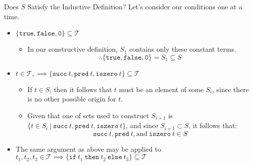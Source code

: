 \documentclass[11pt]{beamer}
\begin{document}
\begin{frame}[fragile=singleslide]{Does $S$ Satisfy the Inductive Definition?}
Let's consider our conditions one at a time.
\begin{itemize}
\item $\{\texttt{true}, \texttt{false}, \texttt{0}\} \subseteq \mathcal{T}$
\begin{itemize}
\item In our constructive definition, $S_1$ contains only these constant terms.  
\begin{equation}
\therefore \{\texttt{true}, \texttt{false}, \texttt{0}\} = S_1 \subseteq S
\end{equation}
\end{itemize}
\item $t \in \mathcal{T}, \implies \{\texttt{succ}\: t, \texttt{pred}\: t, \texttt{iszero}\: t\} \subseteq \mathcal{T}$
\begin{itemize}
\item If $t \in S$, then it follows that $t$ must be an element of some $S_i$, since there is no other possible origin for $t$.  
\item Given that one of sets used to construct $S_{i+1}$ is $\{t \in S_i \:|\: \texttt{succ}\: t, \texttt{pred}\: t, \texttt{iszero}\: t\}$, and since $S_{i+1} \subset S$, it follows that: 
\begin{equation}
\texttt{succ}\: t, \texttt{pred}\: t, \text{and}\: \texttt{iszero}\: t \in S
\end{equation}
\end{itemize}
\item The same argument as above may be applied to $t_1, t_2, t_3 \in \mathcal{T} \implies \{ \texttt{if}\: t_1 \:\texttt{then}\: t_2 \:\texttt{else}\: t_3\} \subseteq \mathcal{T}$
\end{itemize}
\end{frame}
\end{document}
